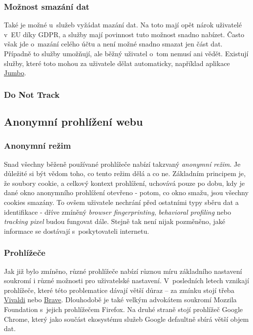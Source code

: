 \subsubsection*{Možnost smazání dat}
Také je možné u~služeb vyžádat mazání dat. Na toto mají opět nárok uživatelé v~EU díky GDPR, a služby mají povinnost tuto možnost snadno nabízet. Často však jde o~mazání celého účtu a není možné snadno smazat jen část dat. Případně to služby umožňují, ale běžný uživatel o~tom nemusí ani vědět. Existují služby, které toto mohou za uživatele dělat automaticky, například aplikace \href{https://www.jumboprivacy.com}{Jumbo}. 

\subsubsection*{Do Not Track}

\subsection{Anonymní prohlížení webu}

\subsubsection*{Anonymní režim}
Snad všechny běženě používané prohlížeče nabízí takzvaný \textit{anonymní režim}. Je důležité si být vědom toho, co tento režim dělá a co ne.
Základním principem je, že soubory cookie, a celkový kontext prohlížení, uchovává pouze po dobu, kdy je dané okno anonymního prohlížení otevřeno - potom, co okno smažu, jsou všechny cookies smazány. To ovšem uživatele nechrání před ostatními typy sběru dat a identifikace - dříve zmíněný \textit{browser fingerprinting}, \textit{behavioral profiling} nebo \textit{tracking pixel} budou fungovat dále. Stejně tak není nijak pozměněno, jaké informace se dostávají s~poskytovateli internetu.

\subsubsection*{Prohlížeče}
Jak již bylo zmíněno, různé prohlížeče nabízí různou míru základního nastavení soukromí i různé možnosti pro uživatelské nastavení.
V~posledních letech vznikají prohlížeče, které této problematice dávají větší důraz -- za zmínku stojí třeba \href{https://vivaldi.com}{Vivaldi} nebo \href{https://brave.com}{Brave}. Dlouhodobě je také velkým advokátem soukromí Mozzila Foundation s~jejich prohlížečem Firefox.
Na druhé straně stojí prohlížeč Google Chrome, který jako součást ekosystému služeb Google defaultně sbírá větší objem dat.


